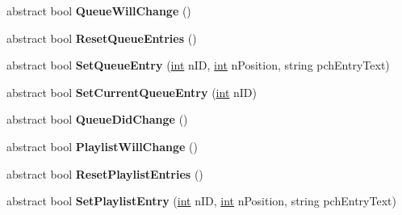 \begin{DoxyCompactItemize}
\item 
\hypertarget{classValve_1_1Steamworks_1_1ISteamMusicRemote_a7aa6385be0698831a02c713582cc0808}{}abstract bool {\bfseries Queue\+Will\+Change} ()\label{classValve_1_1Steamworks_1_1ISteamMusicRemote_a7aa6385be0698831a02c713582cc0808}

\item 
\hypertarget{classValve_1_1Steamworks_1_1ISteamMusicRemote_a7b5bb5f59967076d734f30caace4cb81}{}abstract bool {\bfseries Reset\+Queue\+Entries} ()\label{classValve_1_1Steamworks_1_1ISteamMusicRemote_a7b5bb5f59967076d734f30caace4cb81}

\item 
\hypertarget{classValve_1_1Steamworks_1_1ISteamMusicRemote_a499950b710248c266382b975aaf8bf58}{}abstract bool {\bfseries Set\+Queue\+Entry} (\hyperlink{SDL__thread_8h_a6a64f9be4433e4de6e2f2f548cf3c08e}{int} n\+I\+D, \hyperlink{SDL__thread_8h_a6a64f9be4433e4de6e2f2f548cf3c08e}{int} n\+Position, string pch\+Entry\+Text)\label{classValve_1_1Steamworks_1_1ISteamMusicRemote_a499950b710248c266382b975aaf8bf58}

\item 
\hypertarget{classValve_1_1Steamworks_1_1ISteamMusicRemote_ab594279378f8a49656ce0dfb01c2cf72}{}abstract bool {\bfseries Set\+Current\+Queue\+Entry} (\hyperlink{SDL__thread_8h_a6a64f9be4433e4de6e2f2f548cf3c08e}{int} n\+I\+D)\label{classValve_1_1Steamworks_1_1ISteamMusicRemote_ab594279378f8a49656ce0dfb01c2cf72}

\item 
\hypertarget{classValve_1_1Steamworks_1_1ISteamMusicRemote_abaf9c0add7d0531f50f929bb0da8538d}{}abstract bool {\bfseries Queue\+Did\+Change} ()\label{classValve_1_1Steamworks_1_1ISteamMusicRemote_abaf9c0add7d0531f50f929bb0da8538d}

\item 
\hypertarget{classValve_1_1Steamworks_1_1ISteamMusicRemote_a78f78dffdd32714cf2dc930772c73e36}{}abstract bool {\bfseries Playlist\+Will\+Change} ()\label{classValve_1_1Steamworks_1_1ISteamMusicRemote_a78f78dffdd32714cf2dc930772c73e36}

\item 
\hypertarget{classValve_1_1Steamworks_1_1ISteamMusicRemote_af810cf26c9d925c44199a43e1c9c438e}{}abstract bool {\bfseries Reset\+Playlist\+Entries} ()\label{classValve_1_1Steamworks_1_1ISteamMusicRemote_af810cf26c9d925c44199a43e1c9c438e}

\item 
\hypertarget{classValve_1_1Steamworks_1_1ISteamMusicRemote_abfdee10d57a03f30268eac6ce44d9474}{}abstract bool {\bfseries Set\+Playlist\+Entry} (\hyperlink{SDL__thread_8h_a6a64f9be4433e4de6e2f2f548cf3c08e}{int} n\+I\+D, \hyperlink{SDL__thread_8h_a6a64f9be4433e4de6e2f2f548cf3c08e}{int} n\+Position, string pch\+Entry\+Text)\label{classValve_1_1Steamworks_1_1ISteamMusicRemote_abfdee10d57a03f30268eac6ce44d9474}


\end{DoxyCompactItemize}
